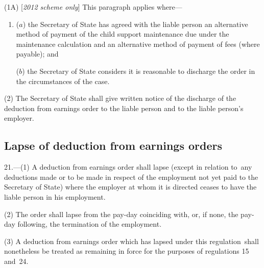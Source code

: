 \documentclass[12pt,a4paper]{article}
\begin{document}
(1A) [\emph{2012 scheme only}] This paragraph applies where—
\begin{enumerate}\item[]
($a$) the Secretary of State has agreed with the liable person an alternative method of payment of the child support maintenance due under the maintenance calculation and an alternative method of payment of fees (where payable); and

($b$) the Secretary of State considers it is reasonable to discharge the order in the circumstances of the case.
\end{enumerate}

(2) The Secretary of State shall give written notice of the discharge of the deduction from earnings order to the liable person and to the liable person’s employer.


\subsection[21. Lapse of deduction from earnings orders]{Lapse of deduction from earnings orders}

21.—(1) A deduction from earnings order shall lapse (except in relation to~any deductions made or to be made in respect of the employment not yet paid to the Secretary of State) where the employer at whom it is directed ceases to have the liable person in his employment.

(2) The order shall lapse from the pay-day coinciding with, or, if none, the pay-day following, the termination of the employment.

(3) A deduction from earnings order which has lapsed under this regulation~shall nonetheless be treated as remaining in force for the purposes of regulations 15 and~24.
\end{document}
